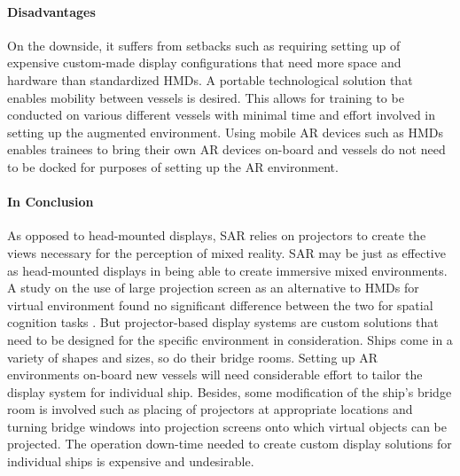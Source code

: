 \paragraph{Disadvantages}
On the downside, it suffers from setbacks such as requiring setting up of expensive custom-made display configurations that need more space and hardware than standardized HMDs. A portable technological solution that enables mobility between vessels is desired. This allows for training to be conducted on various different vessels with minimal time and effort involved in setting up the augmented environment. Using mobile AR devices such as HMDs enables trainees to bring their own AR devices on-board and vessels do not need to be docked for purposes of setting up the AR environment.





\paragraph{In Conclusion}
As opposed to head-mounted displays, SAR relies on projectors to create the views necessary for the perception of mixed reality. SAR may be just as effective as head-mounted displays in being able to create immersive mixed environments. A study on the use of large projection screen as an alternative to HMDs for virtual environment found no significant difference between the two for spatial cognition tasks \parencite{patrick2000using}. But projector-based display systems are custom solutions that need to be designed for the specific environment in consideration. Ships come in a variety of shapes and sizes, so do their bridge rooms. Setting up AR environments on-board new vessels will need considerable effort to tailor the display system for individual ship. Besides, some modification of the ship's bridge room is involved such as placing of projectors at appropriate locations and turning bridge windows into projection screens onto which virtual objects can be projected. The operation down-time needed to create custom display solutions for individual ships is expensive and undesirable.


